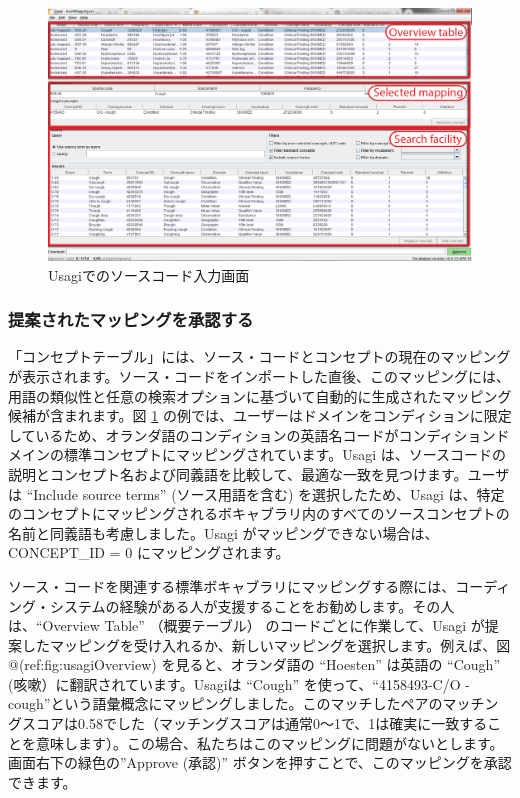\documentclass[
  11pt]{book}
\theoremstyle{definition}
\theoremstyle{definition}
\theoremstyle{definition}
\theoremstyle{definition}
\theoremstyle{remark}
\begin{document}
\begin{figure}

{\centering \includegraphics[width=1\linewidth]{images/ExtractTransformLoad/usagiOverview} 

}

\caption{Usagiでのソースコード入力画面}\label{fig:usagiOverview}
\end{figure}

\subsubsection*{提案されたマッピングを承認する}\label{ux63d0ux6848ux3055ux308cux305fux30deux30c3ux30d4ux30f3ux30b0ux3092ux627fux8a8dux3059ux308b}

「コンセプトテーブル」には、ソース・コードとコンセプトの現在のマッピングが表示されます。ソース・コードをインポートした直後、このマッピングには、用語の類似性と任意の検索オプションに基づいて自動的に生成されたマッピング候補が含まれます。図 \ref{fig:usagiOverview} の例では、ユーザーはドメインをコンディションに限定しているため、オランダ語のコンディションの英語名コードがコンディションドメインの標準コンセプトにマッピングされています。Usagi は、ソースコードの説明とコンセプト名および同義語を比較して、最適な一致を見つけます。ユーザは ``Include source terms'' (ソース用語を含む) を選択したため、Usagi は、特定のコンセプトにマッピングされるボキャブラリ内のすべてのソースコンセプトの名前と同義語も考慮しました。Usagi がマッピングできない場合は、CONCEPT\_ID = 0 にマッピングされます。

ソース・コードを関連する標準ボキャブラリにマッピングする際には、コーディング・システムの経験がある人が支援することをお勧めします。その人は、``Overview Table'' （概要テーブル） のコードごとに作業して、Usagi が提案したマッピングを受け入れるか、新しいマッピングを選択します。例えば、図 @(ref:fig:usagiOverview) を見ると、オランダ語の ``Hoesten'' は英語の ``Cough'' (咳嗽）に翻訳されています。Usagiは ``Cough'' を使って、``4158493-C/O - cough''という語彙概念にマッピングしました。このマッチしたペアのマッチングスコアは0.58でした（マッチングスコアは通常0～1で、1は確実に一致することを意味します）。この場合、私たちはこのマッピングに問題がないとします。画面右下の緑色の''Approve (承認)'' ボタンを押すことで、このマッピングを承認できます。
\end{document}
